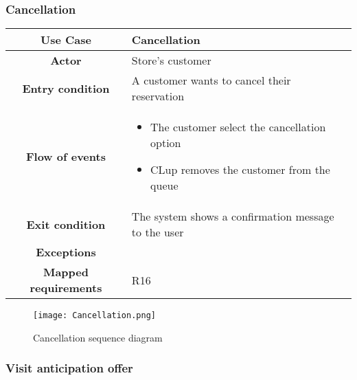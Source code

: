 \documentclass[../../main.tex]{subfiles}
\begin{document}
      \subsubsection{Cancellation}

      \begin{table}[H]
        \centering
          \begin{tabular}{c m{}}
          \hline
          \textbf{Use Case} & Cancellation\\ \hline
          \textbf{Actor} & Store's customer\\ \hline
          \textbf{Entry condition} & A customer wants to cancel their reservation\\  \hline
          \textbf{Flow of events} & \begin{itemize}
                                      \item The customer select the cancellation option
                                      \item CLup removes the customer from the queue
                                    \end{itemize}\\ \hline
          \textbf{Exit condition} & The system shows a confirmation message to the user \\ \hline
          \textbf{Exceptions} &\\ \hline
          \textbf{Mapped requirements} & R16\\ \hline
          \end{tabular}
      \end{table}

      \begin{figure}[H]
        \centering
        \texttt{[image: Cancellation.png]}
        \caption{Cancellation sequence diagram}
      \end{figure}

      
      \subsubsection{Visit anticipation offer}
\end{document}
